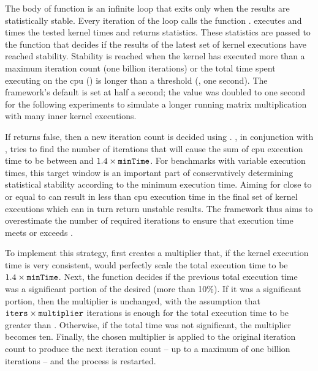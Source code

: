 \documentclass[\main/thesis.tex]{subfiles}
\begin{document}
The body of function  is an infinite loop that exits only when the results are statistically stable.
Every iteration of the loop calls the function .
 executes and times the tested kernel  times and returns statistics.
These statistics are passed to the function  that decides if the results of the latest set of kernel executions have reached stability.
Stability is reached when the kernel has executed more than a maximum iteration count (one billion iterations) or the total time spent executing on the \gls{cpu} () is longer than a threshold (, one second).
The framework's default  is set at half a second; the value was doubled to one second for the following experiments to simulate a longer running matrix multiplication with many inner kernel executions.

If  returns false, then a new iteration count is decided using .
, in conjunction with , tries to find the number of iterations that will cause the sum of \gls{cpu} execution time to be between  and $1.4 \times \textrm{\code{minTime}}$.
For benchmarks with variable execution times, this target window is an important part of conservatively determining statistical stability according to the minimum execution time.
Aiming for close to or equal to  can result in less than  \gls{cpu} execution time in the final set of kernel executions which can in turn return unstable results.
The framework thus aims to overestimate the number of required iterations to ensure that execution time meets or exceeds .

To implement this strategy,  first creates a multiplier that, if the kernel execution time is very consistent, would perfectly scale the total execution time to be $1.4 \times \textrm{\code{minTime}}$.
Next, the function decides if the previous total execution time was a significant portion of the desired  (more than 10\%).
If it was a significant portion, then the multiplier is unchanged, with the assumption that $\textrm{\code{iters}} \times \textrm{\code{multiplier}}$ iterations is enough for the total execution time to be greater than .
Otherwise, if the total time was not significant, the multiplier becomes ten.
Finally, the chosen multiplier is applied to the original iteration count to produce the next iteration count -- up to a maximum of one billion iterations -- and the process is restarted.
\end{document}
